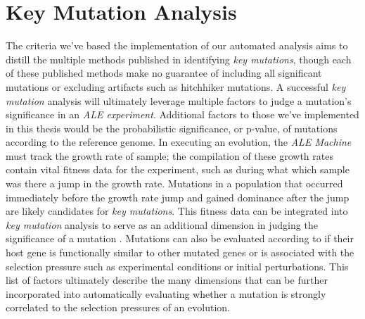 \documentclass[12pt,final,masters,chapterheads]{ucsd}  %
\begin{document}
\section{Key Mutation Analysis}

%
%
%
%
The criteria we've based the implementation of our automated analysis aims to distill the multiple methods published in identifying \textit{key mutations}, though each of these published methods make no guarantee of including all significant mutations or excluding artifacts such as hitchhiker mutations. A successful \textit{key mutation} analysis will ultimately leverage multiple factors to judge a mutation's significance in an \textit{ALE experiment}. Additional factors to those we've implemented in this thesis would be the probabilistic significance, or p-value, of mutations according to the reference genome. In executing an evolution, the \textit{ALE Machine} must track the growth rate of sample; the compilation of these growth rates contain vital fitness data for the experiment, such as during what which sample was there a jump in the growth rate. Mutations in a population that occurred immediately before the growth rate jump and gained dominance after the jump are likely candidates for \textit{key mutations}. This fitness data can be integrated into \textit{key mutation} analysis to serve as an additional dimension in judging the significance of a mutation \cite{pmid25304508}. Mutations can also be evaluated according to if their host gene is functionally similar to other mutated genes or is associated with the selection pressure such as experimental conditions or initial perturbations. This list of factors ultimately describe the many dimensions that can be further incorporated into automatically evaluating whether a mutation is strongly correlated to the selection pressures of an evolution.
\end{document}
